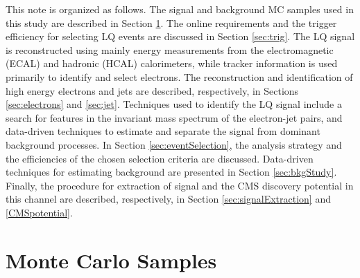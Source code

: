 This note is organized as follows. 
The signal and background MC samples used in this study are described in Section \ref{sec:MCSamples}.
The online requirements and the trigger efficiency for selecting LQ events are discussed in Section \ref{sec:trig}.
The LQ signal is reconstructed using mainly energy measurements from the
electromagnetic (ECAL) and hadronic (HCAL) calorimeters, while tracker information 
is used primarily to identify and select electrons. 
The reconstruction and identification of high energy electrons and jets are described, respectively, 
in Sections \ref{sec:electrons} and \ref{sec:jet}.
Techniques used to identify the LQ signal include a search for features in the invariant mass
spectrum of the electron-jet pairs, and data-driven techniques to estimate 
and separate the signal from dominant background processes.
In Section \ref{sec:eventSelection}, the analysis strategy and the efficiencies of the chosen selection criteria 
are discussed. Data-driven techniques for estimating background are presented in Section \ref{sec:bkgStudy}.
Finally, the procedure for extraction of signal and the CMS discovery potential in this channel are described,
respectively, in Section \ref{sec:signalExtraction} and \ref{CMSpotential}.



\section{Monte Carlo Samples} \label{sec:MCSamples}


